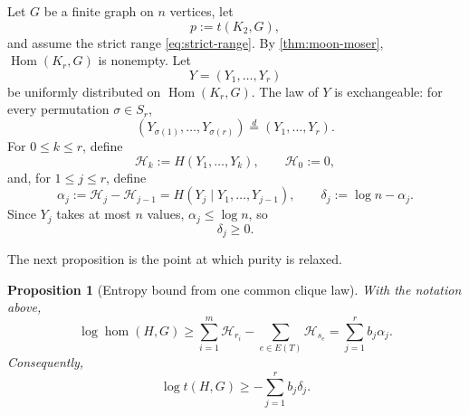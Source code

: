 \documentclass[11pt]{article}
\newtheorem{proposition}[proposition]{Proposition}
\numberwithin{equation}{section}
\DeclareMathOperator{\Hom}{Hom}
\DeclareMathOperator{\homnum}{hom}
\newcommand{\cH}{\mathcal H}
\newcommand{\K}{K}
\begin{document}
Let $G$ be a finite graph on $n$ vertices, let
\[
 p:=t(\K_2,G),
\]
and assume the strict range \eqref{eq:strict-range}.  By
\cref{thm:moon-moser}, $\Hom(\K_r,G)$ is nonempty.  Let
\[
 Y=(Y_1,\dots,Y_r)
\]
be uniformly distributed on $\Hom(\K_r,G)$.  The law of $Y$ is
exchangeable: for every permutation $\sigma\in S_r$,
\[
 (Y_{\sigma(1)},\dots,Y_{\sigma(r)})
 \stackrel{d}{=}
 (Y_1,\dots,Y_r).
\]
For $0\leq k\leq r$, define
\begin{equation}
 \cH_k:=H(Y_1,\dots,Y_k),
 \qquad
 \cH_0:=0,\label{eq:def-Hk}
\end{equation}
and, for $1\leq j\leq r$, define
\begin{equation}
 \alpha_j:=\cH_j-\cH_{j-1}
 =H(Y_j\mid Y_1,\dots,Y_{j-1}),
 \qquad
 \delta_j:=\log n-\alpha_j.\label{eq:def-alpha-delta}
\end{equation}
Since $Y_j$ takes at most $n$ values, $\alpha_j\leq\log n$, so
\begin{equation}
 \delta_j\geq0.\label{eq:delta-nonnegative}
\end{equation}

The next proposition is the point at which purity is relaxed.

\begin{proposition}[Entropy bound from one common clique law]
\label{prop:common-law-bound}
With the notation above,
\begin{equation}
 \log\homnum(H,G)
 \geq
 \sum_{i=1}^m\cH_{r_i}
 -
 \sum_{e\in E(T)}\cH_{s_e}
 =
 \sum_{j=1}^r b_j\alpha_j.\label{eq:common-law-hom-bound}
\end{equation}
Consequently,
\begin{equation}
 \log t(H,G)
 \geq
 -\sum_{j=1}^r b_j\delta_j.\label{eq:basic-deficit-bound}
\end{equation}
\end{proposition}
\end{document}
